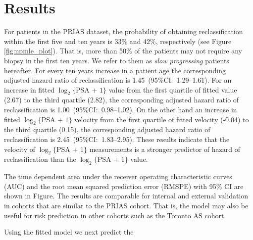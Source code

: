 \section{Results}
For patients in the PRIAS dataset, the probability of obtaining reclassification within the first five and ten years is 33\% and 42\%, respectively (see Figure \ref{fig:npmle_plot}). That is, more than 50\% of the patients may not require any biopsy in the first ten years. We refer to them as \textit{slow progressing} patients hereafter. For every ten years increase in a patient age the corresponding adjusted hazard ratio of reclassification is 1.45~(95\%CI:~1.29--1.61). For an increase in fitted $\log_2\{\mbox{PSA + 1}\}$ value from the first quartile of fitted value (2.67) to the third quartile (2.82), the corresponding adjusted hazard ratio of reclassification is 1.00~(95\%CI:~0.98--1.02). On the other hand an increase in fitted $\log_2\{\mbox{PSA + 1}\}$ velocity from the first quartile of fitted velocity (-0.04) to the third quartile (0.15), the corresponding adjusted hazard ratio of reclassification is 2.45~(95\%CI:~1.83--2.95). These results indicate that the velocity of $\log_2\{\mbox{PSA + 1}\}$ measurements is a stronger predictor of hazard of reclassification than the $\log_2\{\mbox{PSA + 1}\}$ value.

The time dependent area under the receiver operating characteristic curves (AUC) and the root mean squared prediction error (RMSPE) with 95\% CI are shown in Figure. The results are comparable for internal and external validation in cohorts that are similar to the PRIAS cohort. That is, the model may also be useful for risk prediction in other cohorts such as the Toronto AS cohort. 

Using the fitted model we next predict the 
